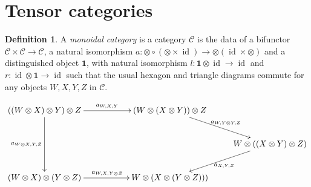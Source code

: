 \documentclass[a4paper, 10pt]{book}
\theoremstyle{definition}
\newtheorem{Def}[theorem]{Definition}
\numberwithin{equation}{chapter}
\newcommand\id{\operatorname{id}}
\newcommand\ot{\otimes}
\newcommand\C{\mathcal C}
\newcommand\one{\mathbf{1}}
\begin{document}
\section{Tensor categories}
\begin{Def}
A \textit{monoidal category} is a category $\C$ is the data of a bifunctor $\C \times \C\rightarrow \C $, a natural isomorphism $a: \otimes \circ( \otimes \times \id) \rightarrow \otimes (\id \times \otimes)$ and a distinguished object $\one$, with natural isomorphism $l: \one\ot \id \rightarrow \id$ and $r:\id \ot \one \rightarrow \id$ such that the usual hexagon and triangle diagrams commute for any objects $W, X, Y, Z$ in $\mathcal{C}$.
\end{Def}
\begin{equation}\label{pentagon}
\xymatrix{
  	((W\otimes X)\otimes Y)\otimes  Z\ar[dd]_{a_{W\otimes X,Y,Z}}\ar[rr]^{a_{W,X,Y}} && (W\otimes(X\otimes Y))\otimes Z\ar[dr]^{a_{W,Y			\otimes Y,Z}}\\
   	& & & W\otimes((X\otimes Y)\otimes Z)\ar[dl]^{a_{X,Y,Z}}\\
  	(W\otimes X)\otimes(Y\otimes Z)\ar[rr]^{a_{W,X,Y\otimes Z}} && W\otimes(X\otimes (Y\otimes Z)))
 	}
\end{equation}
\end{document}
